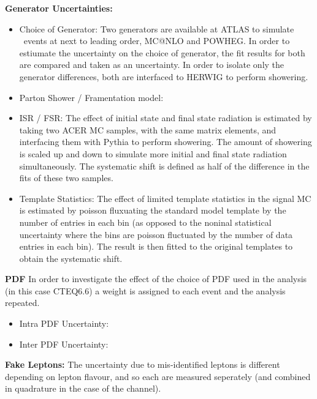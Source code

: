 \vspace{5mm} 
\noindent
\textbf{Generator Uncertainties:}
\begin{itemize}
    \item Choice of Generator: Two generators are available at ATLAS to simulate \ttbar\ events at next to leading order, MC@NLO and POWHEG. In order to estiumate the uncertainty on the choice of generator, the fit results for both are compared and taken as an uncertainty. In order to isolate only the generator differences, both are interfaced to HERWIG to perform showering. 

    \item Parton Shower / Framentation model: 

    \item ISR / FSR: The effect of initial state and final state radiation is estimated by taking two ACER MC samples, with the same matrix elements, and interfacing them with Pythia to perform showering. The amount of showering is scaled up and down to simulate more initial and final state radiation simultaneously. The systematic shift is defined as half of the difference in the fits of these two samples. 

    \item Template Statistics: The effect of limited template statistics in the signal MC is estimated by poisson fluxuating the standard model template by the number of entries in each bin (as opposed to the noninal statistical uncertainty where the bins are poisson fluctuated by the number of data entries in each bin). The result is then fitted to the original templates to obtain the systematic shift. 
\end{itemize}

\vspace{5mm}
\noindent
\textbf{PDF}
In order to investigate the effect of the choice of PDF used in the analysis (in this case CTEQ6.6) a weight is assigned to each event and the analysis repeated. 
\begin{itemize}
  \item Intra PDF Uncertainty:
  \item Inter PDF Uncertainty:
\end{itemize}

\vspace{5mm}

\noindent
\textbf{Fake Leptons:}
The uncertainty due to mis-identified leptons is different depending on lepton flavour, and so each are measured seperately (and combined in quadrature in the case of the \emu channel). 

